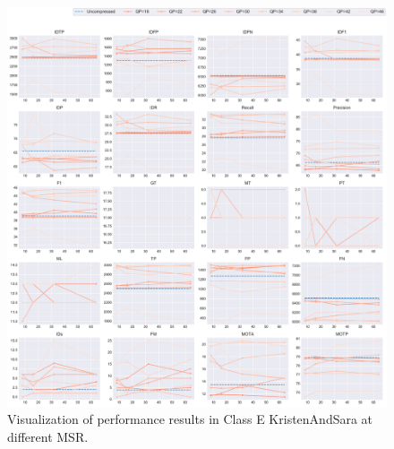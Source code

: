 \begin{figure}[!htbp]
\centering
\includegraphics[width=1.0\linewidth]{img/appendix/KristenAndSara_all_multiplots_msr.pdf}
\caption[Visualization of performance results in Class E KristenAndSara at different MSR]
{Visualization of performance results in Class E KristenAndSara at different MSR.}
\label{fig:KristenAndSara_all_msr}
\end{figure}



